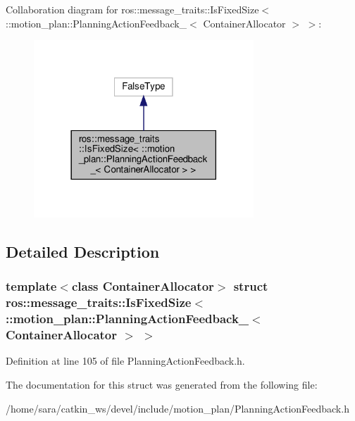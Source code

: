 Collaboration diagram for ros\+:\+:message\+\_\+traits\+:\+:Is\+Fixed\+Size$<$ \+:\+:motion\+\_\+plan\+:\+:Planning\+Action\+Feedback\+\_\+$<$ Container\+Allocator $>$ $>$\+:
\nopagebreak
\begin{figure}[H]
\begin{center}
\leavevmode
\includegraphics[width=234pt]{structros_1_1message__traits_1_1IsFixedSize_3_01_1_1motion__plan_1_1PlanningActionFeedback___3_0ab7fe0ea0089294a991a67e752ec55f5}
\end{center}
\end{figure}


\subsection{Detailed Description}
\subsubsection*{template$<$class Container\+Allocator$>$\newline
struct ros\+::message\+\_\+traits\+::\+Is\+Fixed\+Size$<$ \+::motion\+\_\+plan\+::\+Planning\+Action\+Feedback\+\_\+$<$ Container\+Allocator $>$ $>$}



Definition at line 105 of file Planning\+Action\+Feedback.\+h.



The documentation for this struct was generated from the following file\+:\begin{DoxyCompactItemize}
\item 
/home/sara/catkin\+\_\+ws/devel/include/motion\+\_\+plan/Planning\+Action\+Feedback.\+h\end{DoxyCompactItemize}
